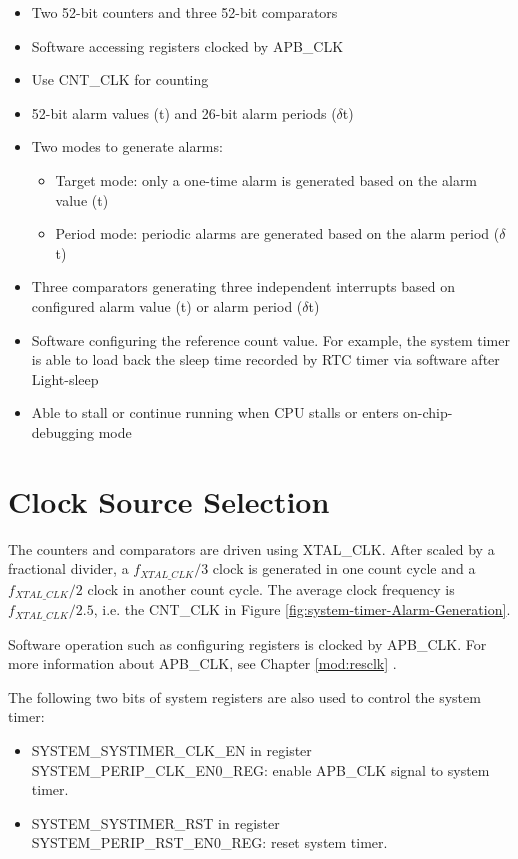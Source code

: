 \documentclass[main\_\_EN.tex]{subfiles}
\begin{document}
\begin{itemize}
    \item Two 52-bit counters and three 52-bit comparators
    \item Software accessing registers clocked by APB\_CLK
    \item Use CNT\_CLK for counting
    \item 52-bit alarm values (t) and 26-bit alarm periods ($\delta$t)
    \item Two modes to generate alarms:
    \begin{itemize}
        \item Target mode: only a one-time alarm is generated based on the alarm value (t)
        \item Period mode: periodic alarms are generated based on the alarm period ($\delta$t)
    \end{itemize}
    \item Three comparators generating three independent interrupts based on configured alarm value (t) or alarm period ($\delta$t)
    \item Software configuring the reference count value. For example, the system timer is able to load back the sleep time recorded by RTC timer via software after Light-sleep
    \item Able to stall or continue running when CPU stalls or enters on-chip-debugging mode
\end{itemize}


\section{Clock Source Selection}
The counters and comparators are driven using XTAL\_CLK. After scaled by a fractional divider, a $f_{XTAL\_CLK}/3$ clock is generated in one count cycle and a $f_{XTAL\_CLK}/2$ clock in another count cycle. The average clock frequency is $f_{XTAL\_CLK}/2.5$, i.e. the CNT\_CLK in Figure \ref{fig:system-timer-Alarm-Generation}.

Software operation such as configuring registers is clocked by APB\_CLK. For more information about APB\_CLK, see Chapter \ref{mod:resclk} \textit{}.

The following two bits of system registers are also used to control the system timer:

\begin{itemize}
    \item SYSTEM\_SYSTIMER\_CLK\_EN in register SYSTEM\_PERIP\_CLK\_EN0\_REG: enable APB\_CLK signal to system timer.
    \item SYSTEM\_SYSTIMER\_RST in register SYSTEM\_PERIP\_RST\_EN0\_REG: reset system timer.
\end{itemize}
\end{document}
